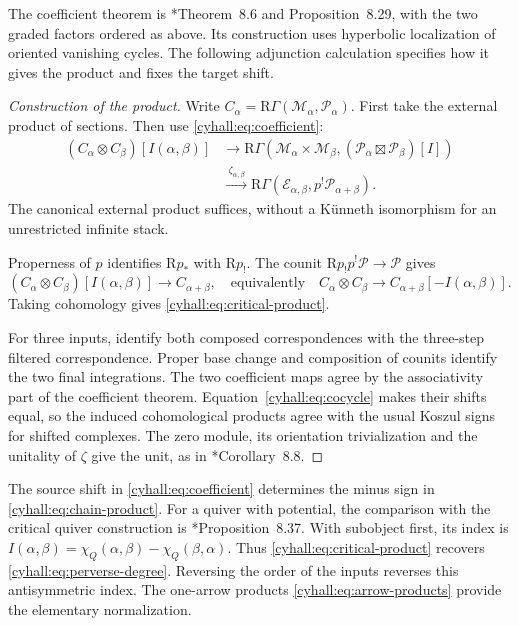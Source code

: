 The coefficient theorem is
\cite{cyhall:KPS}*{Theorem~8.6 and Proposition~8.29},
with the two graded factors ordered as above.
Its construction uses hyperbolic localization of oriented vanishing
cycles. The following adjunction calculation specifies how it gives
the product and fixes the target shift.

\begin{proof}[Construction of the product]
Write $C_\alpha=\mathrm R\Gamma(\mathcal M_\alpha,\mathcal P_\alpha)$.
First take the external product of sections. Then use
\eqref{cyhall:eq:coefficient}:
\[
 \begin{split}
 (C_\alpha\otimes C_\beta)[I(\alpha,\beta)]
 &\longrightarrow
 \mathrm R\Gamma(\mathcal M_\alpha\times\mathcal M_\beta,
       (\mathcal P_\alpha\boxtimes\mathcal P_\beta)[I])\\
 &\xrightarrow{\ \zeta_{\alpha,\beta}\ }
 \mathrm R\Gamma(\mathcal E_{\alpha,\beta},p^!\mathcal P_{\alpha+\beta}).
 \end{split}
\]
The canonical external product suffices, without a K\"unneth
isomorphism for an unrestricted infinite stack.

Properness of $p$ identifies $\mathrm Rp_*$ with $\mathrm Rp_!$.
The counit $\mathrm Rp_!p^!\mathcal P\to\mathcal P$ gives
\begin{equation}\label{cyhall:eq:chain-product}
 (C_\alpha\otimes C_\beta)[I(\alpha,\beta)]
 \longrightarrow C_{\alpha+\beta},
 \quad\text{equivalently}\quad
 C_\alpha\otimes C_\beta\longrightarrow
 C_{\alpha+\beta}[-I(\alpha,\beta)].
\end{equation}
Taking cohomology gives \eqref{cyhall:eq:critical-product}.

For three inputs, identify both composed correspondences with the
three-step filtered correspondence. Proper base change and
composition of counits identify the two final integrations.
The two coefficient maps agree by the associativity part of the
coefficient theorem. Equation~\eqref{cyhall:eq:cocycle} makes their
shifts equal, so the induced cohomological products agree with
the usual Koszul signs for shifted complexes.
The zero module, its orientation trivialization and the unitality
of $\zeta$ give the unit, as in
\cite{cyhall:KPS}*{Corollary~8.8}.
\end{proof}

The source shift in \eqref{cyhall:eq:coefficient} determines the
minus sign in \eqref{cyhall:eq:chain-product}.
For a quiver with potential, the comparison with the critical
quiver construction is
\cite{cyhall:KPS}*{Proposition~8.37}.
With subobject first, its index is
$I(\alpha,\beta)=\chi_Q(\alpha,\beta)-\chi_Q(\beta,\alpha)$.
Thus \eqref{cyhall:eq:critical-product} recovers
\eqref{cyhall:eq:perverse-degree}.
Reversing the order of the inputs reverses this antisymmetric
index. The one-arrow products \eqref{cyhall:eq:arrow-products}
provide the elementary normalization.

